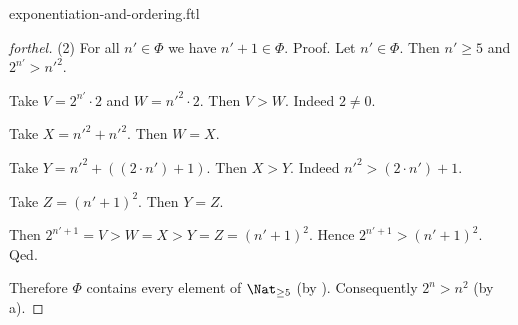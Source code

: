 \documentclass{naproche-library}
\begin{document}
\begin{smodule}[title=Exponentiation and Ordering]{exponentiation-and-ordering.ftl}
\begin{proof}[forthel]
  (2) For all $n' \in \Phi$ we have $n' + 1 \in \Phi$. \newline
  Proof.
    Let $n' \in \Phi$.
    Then $n' \geq 5$ and $2^{n'} > n'^{2}$.

    Take $V = 2^{n'} \cdot 2$ and $W = n'^{2} \cdot 2$.
    Then $V > W$.
    Indeed $2 \neq 0$.

    Take $X = n'^{2} + n'^{2}$.
    Then $W = X$.

    Take $Y = n'^{2} + ((2 \cdot n') + 1)$.
    Then $X > Y$.
    Indeed $n'^{2} > (2 \cdot n') + 1$.

    Take $Z = (n' + 1)^{2}$.
    Then $Y = Z$.

    Then $2^{n' + 1} = V > W = X > Y = Z = (n' + 1)^{2}$.
    Hence $2^{n' + 1} > (n' + 1)^{2}$.
  Qed.

  Therefore $\Phi$ contains every element of $\Nat_{\geq 5}$ (by ).
  Consequently $2^{n} > n^{2}$ (by a).
\end{proof}
\end{smodule}
\end{document}
